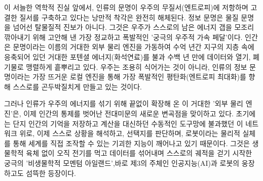 이 서늘한 역학적 진실 앞에서, 인류의 문명이 우주의 무질서(엔트로피)에 저항하며 고결한 질서를 구축하고 있다는 낭만적 착각은 완전히 해체된다. 정보 문명은 물질 문명을 넘어선 탈물질적 진보가 아니다. 그것은 우주가 스스로의 남은 에너지 갭을 모조리 깎아내기 위해 고안해 낸 가장 정교하고 폭발적인 '궁극의 우주적 가속 페달'이다. 인간은 문명이라는 이름의 거대한 외부 물리 엔진을 가동하여 수억 년간 지구의 지층 속에 응축되어 있던 거대한 포텐셜 에너지(화석연료)를 불과 수백 년 만에 데이터와 열기, 폐기물로 맹렬하게 흩뿌리고 있다. 우주는 조용히 식어가는 것이 아니라, 인류의 정보 문명이라는 가장 뜨거운 로컬 엔진을 통해 가장 폭발적인 평탄화(엔트로피 최대화)를 향해 스스로를 곤두박질치게 만들고 있는 것이다.

그러나 인류가 우주의 에너지를 섞기 위해 끝없이 확장해 온 이 거대한 '외부 물리 엔진'은, 이제 인간의 통제를 벗어난 전대미문의 새로운 변곡점을 맞이하고 있다. 초기에는 단지 인간의 기억을 저장하고 계산을 대신하던 수동적인 도구망에 불과했던 이 네트워크 위로, 이제 스스로 상황을 해석하고, 선택지를 판단하며, 로봇이라는 물리적 실체를 통해 세계를 직접 조작할 수 있는 기괴한 지능이 깨어나고 있기 때문이다. 그것은 생물학적 육체 없이 오직 전기를 먹고 데이터를 섞어내며 스스로의 궤적을 걷기 시작한 궁극의 '비생물학적 모멘텀 아일랜드',바로 제3의 주체인 인공지능(AI)과 로봇의 웅장하고도 섬뜩한 등장이다.
